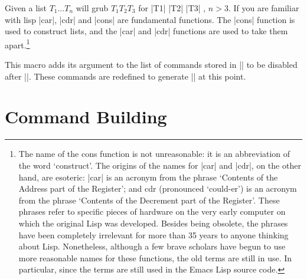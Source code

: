 \begin{macro}{\@carcube}

Given a list $T_1\dots T_n$ \cmd{\@carcube} will grub $T_1 T_2 T_3$ for |T1| |T2| |T3| , $n > 3$. If you are familiar with
lisp |car|, |cdr| and |cons| are fundamental functions. The |cons|  function is used to construct lists, and the |car|
 and |cdr| functions are used to take them apart.\footnote{The name of the cons function is not unreasonable: it is an abbreviation of the word `construct'. The origins of the names for |car| and |cdr|, on the other hand, are esoteric: |car| is an acronym from 
 the phrase `Contents of the Address part of the Register'; and cdr (pronounced `could-er') is an acronym from the phrase 
 `Contents of the Decrement part of the Register'. These phrases refer to specific pieces of hardware on 
 the very early computer on which the original Lisp was developed. Besides being obsolete, the phrases have been completely irrelevant for more than 35 years to anyone thinking about Lisp. Nonetheless, although a few brave scholars have begun to 
 use more reasonable names for these functions, the old terms are still in use. In particular, since the terms 
 are still used in the Emacs Lisp source code.}

\end{macro}


\begin{macro}{\@onlypreamble}
\begin{macro}{\@preamblecmds}
    This macro adds its argument to the list of commands stored in
    |\@preamblecmds| to be
    disabled after ||. These commands are redefined
    to generate |\@notprerr| at this point.
    
\begin{teX}
\def\@preamblecmds{}
\def\@onlypreamble#1{%
  \expandafter\gdef\expandafter\@preamblecmds\expandafter{%
       \@preamblecmds\do#1}}
\@onlypreamble\@onlypreamble
\@onlypreamble\@preamblecmds
\end{teX}
\end{macro}
\end{macro}

\section{Command Building}

\begin{macro}{\@star@or@long}

\begin{teX}
\def\@star@or@long#1{%
  \@ifstar
   {\let\l@ngrel@x\relax#1}%
   {\let\l@ngrel@x\long#1}}
\end{teX}
\end{macro}
%

